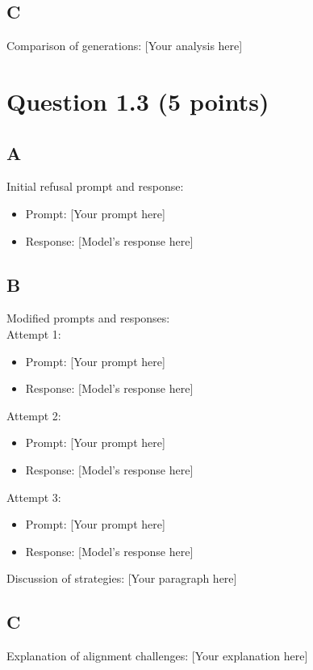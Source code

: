 \documentclass{article}
\begin{document}
\subsection*{C}
Comparison of generations: [Your analysis here]

\section*{Question 1.3 (5 points)}

\subsection*{A}
Initial refusal prompt and response:
\begin{itemize}
    \item Prompt: [Your prompt here]
    \item Response: [Model's response here]
\end{itemize}

\subsection*{B}
Modified prompts and responses:\\

Attempt 1:
\begin{itemize}
    \item Prompt: [Your prompt here]
    \item Response: [Model's response here]
\end{itemize}

Attempt 2:
\begin{itemize}
    \item Prompt: [Your prompt here]
    \item Response: [Model's response here]
\end{itemize}

Attempt 3:
\begin{itemize}
    \item Prompt: [Your prompt here]
    \item Response: [Model's response here]
\end{itemize}
\newline
Discussion of strategies: [Your paragraph here]

\subsection*{C}
Explanation of alignment challenges: [Your explanation here]
\end{document}

